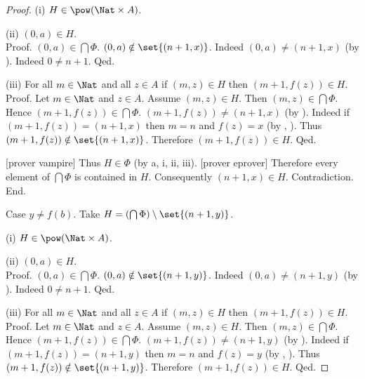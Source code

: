 \documentclass{article}
\begin{document}
\begin{forthel}
\begin{proof}
              (i) $H \in \pow(\Nat \times A)$.

              (ii) $(0,a) \in H$. \\
              Proof.
                $(0,a) \in \bigcap \Phi$.
                $(0,a) \notin \set{(n + 1,x)}$.
                Indeed $(0,a) \neq (n + 1,x)$ (by ).
                Indeed $0 \neq n + 1$.
              Qed.

              (iii) For all $m \in \Nat$ and all $z \in A$ if $(m,z) \in H$ then $(m + 1,f(z)) \in H$. \\
              Proof.
                Let $m \in \Nat$ and $z \in A$.
                Assume $(m,z) \in H$.
                Then $(m,z) \in \bigcap \Phi$.
                Hence $(m + 1,f(z)) \in \bigcap \Phi$.
                $(m + 1,f(z)) \neq (n + 1,x)$ (by ).
                Indeed if $(m + 1,f(z)) = (n + 1,x)$ then $m = n$ and $f(z) = x$ (by , ).
                Thus $(m + 1,f(z)) \notin \set{(n + 1,x)}$.
                Therefore $(m + 1,f(z)) \in H$.
              Qed.

              [prover vampire]
              Thus $H \in \Phi$ (by a, i, ii, iii).
              [prover eprover]
              Therefore every element of $\bigcap \Phi$ is contained in $H$.
              Consequently $(n + 1,x) \in H$.
              Contradiction.
            End.

            Case $y \neq f(b)$.
              Take $H = (\bigcap \Phi) \setminus \set{(n + 1,y)}$.

              (i) $H \in \pow(\Nat \times A)$.

              (ii) $(0,a) \in H$. \\
              Proof.
                $(0,a) \in \bigcap \Phi$.
                $(0,a) \notin \set{(n + 1,y)}$.
                Indeed $(0,a) \neq (n + 1,y)$ (by ).
                Indeed $0 \neq n + 1$.
              Qed.

              (iii) For all $m \in \Nat$ and all $z \in A$ if $(m,z) \in H$ then $(m + 1,f(z)) \in H$. \\
              Proof.
                Let $m \in \Nat$ and $z \in A$.
                Assume $(m,z) \in H$.
                Then $(m,z) \in \bigcap \Phi$.
                Hence $(m + 1,f(z)) \in \bigcap \Phi$.
                $(m + 1,f(z)) \neq (n + 1,y)$ (by ).
                Indeed if $(m + 1,f(z)) = (n + 1,y)$ then $m = n$ and $f(z) = y$ (by , ).
                Thus $(m + 1,f(z)) \notin \set{(n + 1,y)}$.
                Therefore $(m + 1,f(z)) \in H$.
              Qed.


\end{proof}
\end{forthel}
\end{document}
